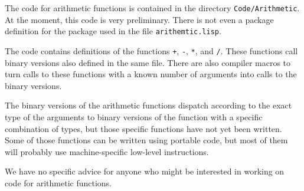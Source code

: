 The code for arithmetic functions is contained in the directory
\texttt{Code/Arithmetic}.  At the moment, this code is very
preliminary.  There is not even a package definition for the package
used in the file \texttt{arithemtic.lisp}.

The code contains definitions of the functions \texttt{+}, \texttt{-},
\texttt{*}, and \texttt{/}.  These functions call binary versions also
defined in the same file.  There are also compiler macros to turn
calls to these functions with a known number of arguments into calls
to the binary versions.

The binary versions of the arithmetic functions dispatch according to
the exact type of the arguments to binary versions of the function
with a specific combination of types, but those specific functions
have not yet been written.  Some of those functions can be written
using portable code, but most of them will probably use
machine-specific low-level instructions. 

We have no specific advice for anyone who might be interested in
working on code for arithmetic functions.  



